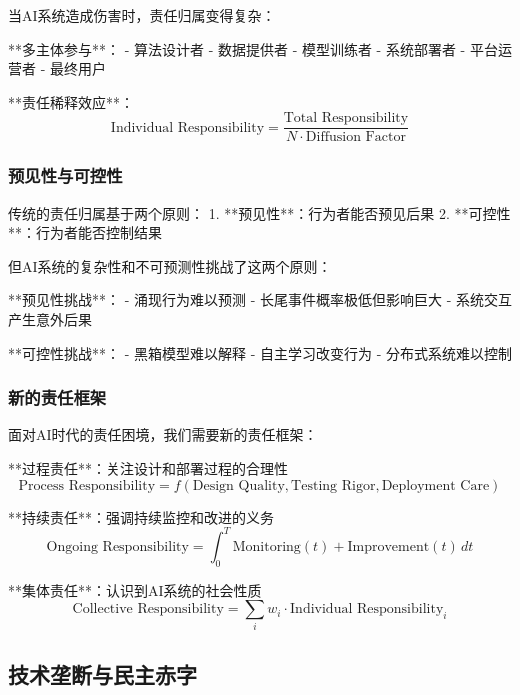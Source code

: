 当AI系统造成伤害时，责任归属变得复杂：

**多主体参与**：
- 算法设计者
- 数据提供者
- 模型训练者
- 系统部署者
- 平台运营者
- 最终用户

**责任稀释效应**：
\begin{equation}
\text{Individual Responsibility} = \frac{\text{Total Responsibility}}{N \cdot \text{Diffusion Factor}}
\end{equation}

\subsubsection{预见性与可控性}

传统的责任归属基于两个原则：
1. **预见性**：行为者能否预见后果
2. **可控性**：行为者能否控制结果

但AI系统的复杂性和不可预测性挑战了这两个原则：

**预见性挑战**：
- 涌现行为难以预测
- 长尾事件概率极低但影响巨大
- 系统交互产生意外后果

**可控性挑战**：
- 黑箱模型难以解释
- 自主学习改变行为
- 分布式系统难以控制

\subsubsection{新的责任框架}

面对AI时代的责任困境，我们需要新的责任框架：

**过程责任**：关注设计和部署过程的合理性
\begin{equation}
\text{Process Responsibility} = f(\text{Design Quality}, \text{Testing Rigor}, \text{Deployment Care})
\end{equation}

**持续责任**：强调持续监控和改进的义务
\begin{equation}
\text{Ongoing Responsibility} = \int_0^T \text{Monitoring}(t) + \text{Improvement}(t) \, dt
\end{equation}

**集体责任**：认识到AI系统的社会性质
\begin{equation}
\text{Collective Responsibility} = \sum_{i} w_i \cdot \text{Individual Responsibility}_i
\end{equation}

\subsection{技术垄断与民主赤字}

